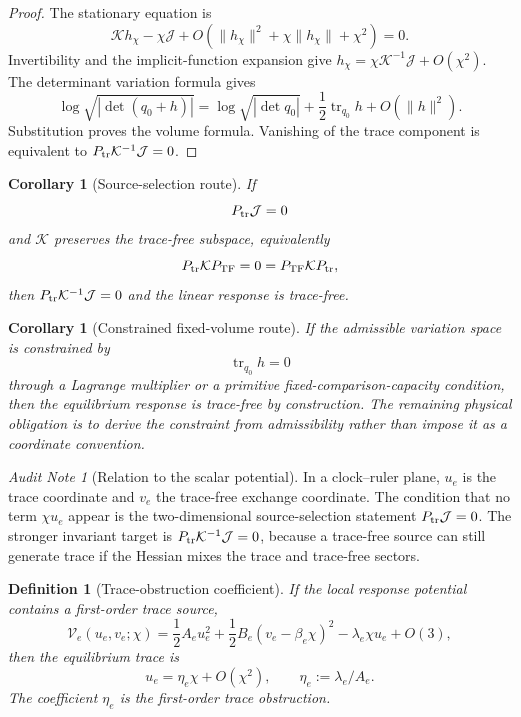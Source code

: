 \documentclass[11pt]{article}
\newtheorem{corollary}[theorem]{Corollary}
\newtheorem{definition}[theorem]{Definition}
\theoremstyle{remark}
\newtheorem{audit}[theorem]{Audit Note}
\newcommand{\Ptr}{P_{\rm tr}}
\newcommand{\Ptf}{P_{\rm TF}}
\begin{document}
\begin{proof}
The stationary equation is
\[
        \mathcal K h_\chi-\chi\mathcal J
        +O(\|h_\chi\|^2+\chi\|h_\chi\|+\chi^2)=0.
\]
Invertibility and the implicit-function expansion give $h_\chi=\chi\mathcal K^{-1}\mathcal J+O(\chi^2)$.  The determinant variation formula gives
\[
        \log\sqrt{|\det(q_0+h)|}
        =\log\sqrt{|\det q_0|}
        +\frac12\operatorname{tr}_{q_0}h+O(\|h\|^2).
\]
Substitution proves the volume formula.  Vanishing of the trace component is equivalent to $\Ptr\mathcal K^{-1}\mathcal J=0$.
\end{proof}

\begin{corollary}[Source-selection route]
\label{cor:source-selection-no-trace}
If
\[
        \Ptr\mathcal J=0
\]
and $\mathcal K$ preserves the trace-free subspace, equivalently
\[
        \Ptr\mathcal K\Ptf=0=\Ptf\mathcal K\Ptr,
\]
then $\Ptr\mathcal K^{-1}\mathcal J=0$ and the linear response is trace-free.
\end{corollary}

\begin{corollary}[Constrained fixed-volume route]
\label{cor:constrained-no-trace}
If the admissible variation space is constrained by
\[
        \operatorname{tr}_{q_0}h=0
\]
through a Lagrange multiplier or a primitive fixed-comparison-capacity condition, then the equilibrium response is trace-free by construction.  The remaining physical obligation is to derive the constraint from admissibility rather than impose it as a coordinate convention.
\end{corollary}

\begin{audit}[Relation to the scalar potential]
In a clock--ruler plane, $u_e$ is the trace coordinate and $v_e$ the trace-free exchange coordinate.  The condition that no term $\chi u_e$ appear is the two-dimensional source-selection statement $\Ptr\mathcal J=0$.  The stronger invariant target is $\Ptr\mathcal K^{-1}\mathcal J=0$, because a trace-free source can still generate trace if the Hessian mixes the trace and trace-free sectors.
\end{audit}

\begin{definition}[Trace-obstruction coefficient]
\label{def:trace-obstruction-coefficient}
If the local response potential contains a first-order trace source,
\[
        \mathcal V_e(u_e,v_e;\chi)
        =
        \frac12 A_eu_e^2+\frac12 B_e(v_e-\beta_e\chi)^2
        -\lambda_e\chi u_e+O(3),
\]
then the equilibrium trace is
\[
        u_e=\eta_e\chi+O(\chi^2),
        \qquad
        \eta_e:=\lambda_e/A_e.
\]
The coefficient \(\eta_e\) is the first-order trace obstruction.
\end{definition}
\end{document}

